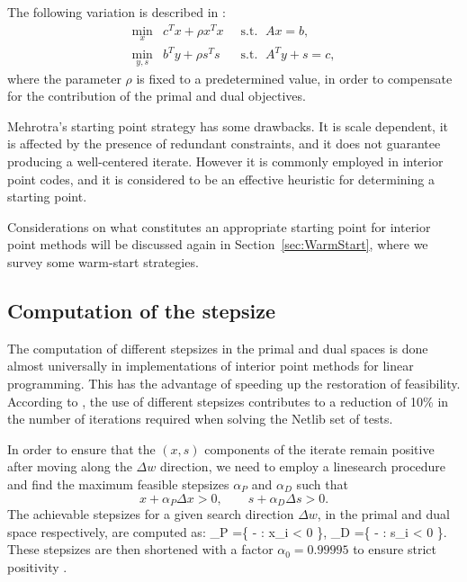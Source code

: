 The following variation is described in \cite{GondzioTerlaky}:
\begin{eqnarray*} 
  \min_x    \!\! & c^Tx + \rho x^Tx & \;\;\mbox{s.t. }\; Ax = b,      \\
  \min_{y,s}\!\! & b^Ty + \rho s^Ts & \;\;\mbox{s.t. }\; A^Ty + s = c,
\end{eqnarray*}
where the parameter $\rho$ is fixed to a predetermined value, in order
to compensate for the contribution of the primal and dual objectives.

Mehrotra's starting point strategy has some drawbacks. It is scale dependent,
it is affected by the presence of redundant constraints,
and it does not guarantee producing a well-centered iterate.
However it is commonly employed in interior point codes, and it is
considered to be an effective heuristic for determining a starting point.

Considerations on what constitutes an appropriate starting point 
for interior point methods will be discussed
again in Section~\ref{sec:WarmStart}, where we survey some
warm-start strategies.

%
%
\subsection{Computation of the stepsize}

The computation of different stepsizes in the primal and dual spaces is
done almost universally in implementations of interior point methods
for linear programming.
This has the advantage of
speeding up the restoration of feasibility. According to
\cite{GondzioTerlaky}, the use of different stepsizes contributes 
to a reduction of 10\% in the number of iterations required 
when solving the Netlib 
set of tests.

In order to ensure that the $(x,s)$ components of the iterate
remain positive after moving along the
$\Delta w$ direction, we need to employ a linesearch procedure 
and find the maximum feasible stepsizes $\alpha_P$ and $\alpha_D$ 
such that
\[
  x + \alpha_P \Delta x > 0, \qquad  s + \alpha_D \Delta s > 0.
\]
The achievable stepsizes for a given search direction $\Delta w$, 
in the primal and dual space respectively, are computed as:
\be  \label{eq:Alphas}
  \alpha_P =\min \left\{ - : \Delta x_i < 0 \right\},
  \quad\;
  \alpha_D =\min \left\{ - : \Delta s_i < 0 \right\}.
\ee
These stepsizes are then shortened with a factor $\alpha_0 = 0.99995$
to ensure strict positivity \cite{GondzioTerlaky,LustigMarstenShanno}.

